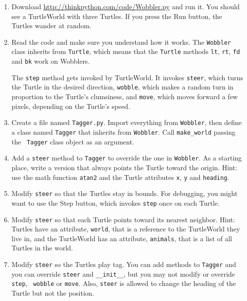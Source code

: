 \documentclass[10pt]{book}
\begin{document}
\begin{CJK}{UTF8}{gbsn}
\begin{exercise}
\begin{enumerate}

\item Download \url{http://thinkpython.com/code/Wobbler.py} and run it.  You
should see a TurtleWorld with three Turtles.  If you press the
{\sf Run} button, the Turtles wander at random.

\item Read the code and make sure you understand how it works.
The {\tt Wobbler} class inherits from {\tt Turtle}, which means
that the {\tt Turtle} methods {\tt lt}, {\tt rt}, {\tt fd}
and {\tt bk} work on Wobblers.

The {\tt step} method gets invoked by TurtleWorld.  It invokes 
{\tt steer}, which turns the Turtle in the desired direction,
{\tt wobble}, which makes a random turn in proportion to the Turtle's
clumsiness, and {\tt move}, which moves forward a few pixels,
depending on the Turtle's speed.

\item Create a file named {\tt Tagger.py}.  Import everything from
  {\tt Wobbler}, then define a class named {\tt Tagger} that inherits
  from {\tt Wobbler}.  Call \verb"make_world" passing the {\tt
    Tagger} class object as an argument.

\item Add a {\tt steer} method to {\tt Tagger} to override the one in
  {\tt Wobbler}.  As a starting place, write a version that always
  points the Turtle toward the origin.  Hint: use the math function
  {\tt atan2} and the Turtle attributes {\tt x}, {\tt y} and
  {\tt heading}.

\item Modify {\tt steer} so that the Turtles stay in bounds.
  For debugging, you might want to use the {\sf Step} button,
  which invokes {\tt step} once on each Turtle.

\item Modify {\tt steer} so that each Turtle points toward its nearest
  neighbor.  Hint: Turtles have an attribute, {\tt world}, that is a
  reference to the TurtleWorld they live in, and the TurtleWorld has
  an attribute, {\tt animals}, that is a list of all Turtles in the
  world.

\item Modify {\tt steer} so the Turtles play tag.  You can add methods
  to {\tt Tagger} and you can override {\tt steer} and
  \verb"__init__", but you may not modify or override {\tt step}, {\tt
    wobble} or {\tt move}.  Also, {\tt steer} is allowed to change the
  heading of the Turtle but not the position.


\end{enumerate}
\end{exercise}
\end{CJK}
\end{document}
